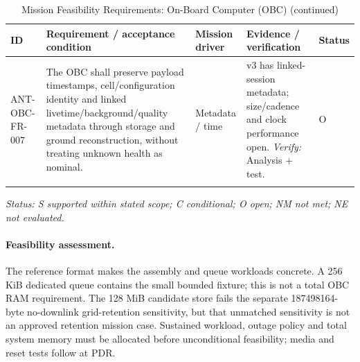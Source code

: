 \begin{table}[H]\centering\small\setlength{\tabcolsep}{3pt}
\ContinuedFloat\captionsetup{list=no}
\caption{Mission Feasibility Requirements: On-Board Computer (OBC) (continued)}
\begin{tabular}{@{}
>{\RaggedRight\arraybackslash}p{}
>{\RaggedRight\arraybackslash}p{}
>{\RaggedRight\arraybackslash}p{}
>{\RaggedRight\arraybackslash}p{}
>{\RaggedRight\arraybackslash}p{}
@{}}
\toprule ID & Requirement / acceptance condition & Mission driver & Evidence / verification & Status\\\midrule
{}\label{req:ANT-OBC-FR-007}\mbox{ANT-OBC-}\newline\mbox{FR-007} & The OBC shall preserve payload timestamps, cell/configuration identity and linked livetime/background/quality metadata through storage and ground reconstruction, without treating unknown health as nominal. & Metadata / time & v3 has linked-session metadata; size/cadence and clock performance open. \emph{Verify:} Analysis + test. & O\\
\addlinespace[3pt]
\bottomrule
\end{tabular}
\end{table}
\textit{Status: S supported within stated scope; C conditional; O open; NM not met; NE not evaluated.}
\paragraph{Feasibility assessment.} The reference format makes the assembly and queue workloads concrete. A 256 KiB dedicated queue contains the small bounded fixture; this is not a total OBC RAM requirement. The 128 MiB candidate store fails the separate 187498164-byte no-downlink grid-retention sensitivity, but that unmatched sensitivity is not an approved retention mission case. Sustained workload, outage policy and total system memory must be allocated before unconditional feasibility; media and reset tests follow at PDR.
